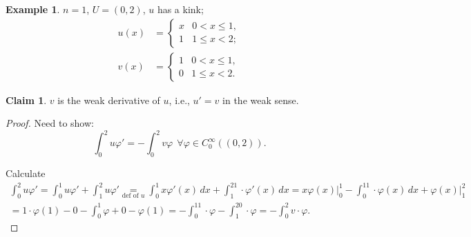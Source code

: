 \documentclass[12pt]{article}
\theoremstyle{definition}
\newtheorem*{claim*}{Claim}
\newtheorem{example}{Example}
\begin{document}
\setcounter{example}{0}
\begin{example}
$n=1$, $U=(0,2)$, $u$ has a kink;
\begin{align*}
u(x)&=\left\{\begin{array}{ll}x&0<x\leq1,\\1&1\leq x<2;\end{array}\right.\\
v(x)&=\left\{\begin{array}{ll}1&0<x\leq1,\\0&1\leq x<2.\end{array}\right.
\end{align*}

\begin{claim*}
$v$ is the weak derivative of $u$, i.e., $u'=v$ in the weak sense.
\end{claim*}

\begin{proof}
Need to show:
\[\int_0^2u\varphi'=-\int_0^2v\varphi\ \ \forall\varphi\in C_0^\infty((0,2)).\]

Calculate
\begin{multline*}
\int_0^2u\varphi'=\int_0^1u\varphi'+\int_1^2u\varphi'\underset{\text{def of }u}=\int_0^1x\varphi'(x)\,dx+\int_1^21\cdot\varphi'(x)\,dx=x\varphi(x)\Big|_0^1-\int_0^11\cdot\varphi(x)\,dx+\varphi(x)\Big|_1^2\\
=1\cdot\varphi(1)-0-\int_0^1\varphi+0-\varphi(1)=-\int_0^11\cdot\varphi-\int_1^20\cdot\varphi=-\int_0^2v\cdot\varphi.
\end{multline*}
\end{proof}
\end{example}
\end{document}
